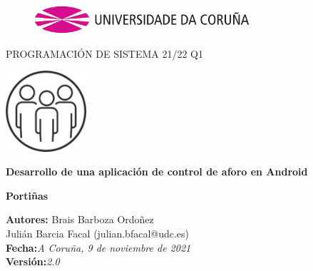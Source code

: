 \documentclass[a4paper,openright,12pt]{article}
\begin{document}
\begin{titlepage}

\begin{center}
\vspace*{-1in}
\begin{figure}[htb]
\begin{center}
\includegraphics[width=8cm]{udc.eps}
\end{center}
\end{figure}

\vspace*{1in}
PROGRAMACIÓN DE SISTEMA 21/22 Q1\\
\begin{center}
\includegraphics[width=3cm,height=3cm]{ejemplo.jpg}
\end{center}
\vspace*{10mm}
\begin{Large}
\textbf{Desarrollo de una aplicación de control de aforo en Android} \\
\end{Large}
\vspace*{10mm}
\begin{Large}
\textbf{Portiñas} \\
\end{Large}

\vspace*{3in}
\begin{large}
\raggedleft
\textbf{Autores:} Brais Barboza Ordoñez\\
Julián Barcia Facal (julian.bfacal@udc.es) \\
\textbf{Fecha:}\textit{A Coruña, 9 de noviembre de 2021}\\
\textbf{Versión:}\textit{2.0}\\

\end{large}

\end{center}
\end{titlepage} 

\newpage
\end{document}
